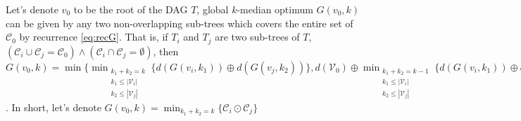 \begin{theorem}
Let's denote $v_0$ to be the root of the {DAG} $T$, global $k$-median
optimum $G(v_0, k)$ can be given by any two non-overlapping sub-trees
which covers the entire set of $\mathcal{C}_0$ by recurrence
\ref{eq:recG}. That is, if $T_i$ and $T_j$ are two sub-trees of $T$,
$(\mathcal{C}_i \cup \mathcal{C}_j = \mathcal{C}_0) \wedge (\mathcal{C}_i \cap \mathcal{C}_j = \emptyset)$, then 
        $G(v_0, k) = 
            \min \{ \min_{\substack{
                       k_1 + k_2 = k\\
                        k_1 \leq |\mathcal{V}_i|\\
                        k_2 \leq |\mathcal{V}_j| }}
                  \{ d(G(v_i, k_1)) \oplus d(G(v_j, k_2)) \}
                      , 
            d(\mathcal{V}_0) \oplus
            \min_{\substack{
                       k_1 + k_2 = k-1\\
                        k_1 \leq |\mathcal{V}_i|\\
                        k_2 \leq |\mathcal{V}_j| }}
                  \{ d(G(v_i, k_1)) \oplus d(G(v_j, k_2)) \}
        \}$. In short, let's denote $G(v_0, k) = \min_{k_1 + k_2 = k}\{ \mathcal{C}_i \odot \mathcal{C}_j \}$
\end{theorem}

